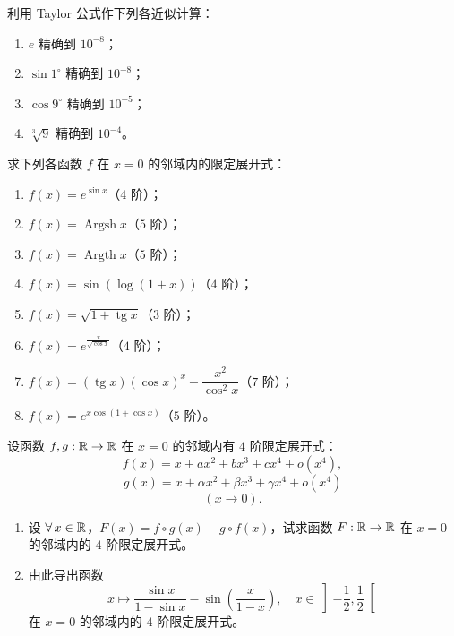 \begin{exercise}
	\item 利用 Taylor 公式作下列各近似计算：
	\begin{enumerate}[label=\arabic*)]
		\item $e$ 精确到 $10^{-8}$；
		\item $\sin1^{\circ}$ 精确到 $10^{-8}$；
		\item $\cos9^{\circ}$ 精确到 $10^{-5}$；
		\item $\sqrt[3]{9}$ 精确到 $10^{-4}$。
	\end{enumerate}
\end{exercise}

\begin{exercise}
	\item 求下列各函数 $f$ 在 $x=0$ 的邻域内的限定展开式：
	\begin{enumerate}[label=\arabic*)]
		\item $f(x)=e^{\sin x}$（$4$ 阶）；
		\item $f(x)=\operatorname{Argsh}x$（$5$ 阶）；
		\item $f(x)=\operatorname{Argth}x$（$5$ 阶）；
		\item $f(x)=\sin(\log(1+x))$（$4$ 阶）；
		\item $f(x)=\sqrt{1+\operatorname{tg}x}$（$3$ 阶）；
		\item $f(x)=e^{\frac{x}{\sqrt{\cos x}}}$（$4$ 阶）；
		\item $f(x)=(\operatorname{tg}x)(\cos x)^x-\dfrac{x^2}{\cos^2x}$（$7$ 阶）；
		\item $f(x)=e^{x\cos(1+\cos x)}$（$5$ 阶）。
	\end{enumerate}
\end{exercise}

\begin{exercise}
	\item 设函数 $f,g:\mathbb{R}\to\mathbb{R}$ 在 $x=0$ 的邻域内有 $4$ 阶限定展开式：
	\[f(x)=x+ax^2+bx^3+cx^4+o(x^4),\]
	\[g(x)=x+\alpha x^2+\beta x^3+\gamma x^4+o(x^4)\]
	\[(x\to0).\]
	\begin{enumerate}[label=\arabic*)]
		\item 设 $\forall\,x\in\mathbb{R}$，$F(x)=f\circ g(x)-g\circ f(x)$，试求函数 $F:\mathbb{R}\to\mathbb{R}$ 在 $x=0$ 的邻域内的 $4$ 阶限定展开式。
		\item 由此导出函数
		\[x\longmapsto\frac{\sin x}{1-\sin x}-\sin\left(\frac{x}{1-x}\right),\quad x\in\left]-\frac{1}{2},\frac{1}{2}\right[\]
		在 $x=0$ 的邻域内的 $4$ 阶限定展开式。
	\end{enumerate}
\end{exercise}

